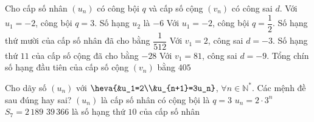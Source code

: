 

\begin{ex}%
 Cho cấp  số nhân $(u_n)$ có công bội $q$ và cấp số cộng $(v_n)$ có công sai $d$.
 \choiceTF 
  {\True  Với $u_1=-2$, công bội $q=3$. Số hạng $u_2$ là $-6$}
  {Với $u_1=-2$, công bội $q=\dfrac{1}{2}$. Số hạng thứ mười của cấp  số nhân đã cho bằng $\dfrac{1}{512}$}
  {\True Với $v_1=2$, công sai  $d=-3$. Số hạng thứ $11$ của cấp số cộng đã cho bằng $-28$}
  {\True Với $v_1=81$, công sai $d=-9$.  Tổng chín số hạng đầu tiên của cấp số cộng $(v_n)$ bằng $405$}
\end{ex}

\begin{ex}%
	Cho dãy số $\left(u_n\right)$ với $\heva{&u_1=2\\&u_{n+1}=3u_n}$, $\forall n \in \mathbb{N}^*$. Các mệnh  đề sau đúng hay sai?
	\choiceTF 
		{\True $\left(u_n\right)$  là cấp số nhân có cộng bội là $q=3$}
		{$u_n=2\cdot 3^n$} 
		 {$S_7=2\,189$}
		{\True $39\,366$ là số hạng thứ $10$ của cấp số  nhân}
\end{ex}

